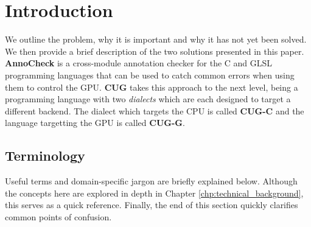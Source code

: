 \documentclass[a4paper,12pt,twoside,openright]{report}
\begin{document}
\pagestyle{empty}
\singlespacing

\onehalfspacing

\singlespacing


\setcounter{page}{0}
\pagestyle{plain}
\tableofcontents

\onehalfspacing


\chapter{Introduction}
\setcounter{page}{1}

We outline the problem, why it is important and why it has not yet been solved.
We then provide a brief description of the two solutions presented in this
paper. \textbf{AnnoCheck} is a cross-module annotation checker for the C and
GLSL programming languages that can be used to catch common errors when using
them to control the GPU. \textbf{CUG} takes this approach to the next level,
being a programming language with two \textit{dialects} which are each designed
to target a different backend. The dialect which targets the CPU is called
\textbf{CUG-C} and the language targetting the GPU is called \textbf{CUG-G}.

\section{Terminology}

Useful terms and domain-specific jargon are briefly explained below. Although
the concepts here are explored in depth in Chapter
\ref{chp:technical_background}, this serves as a quick reference. Finally, the
end of this section quickly clarifies common points of confusion.
\end{document}
